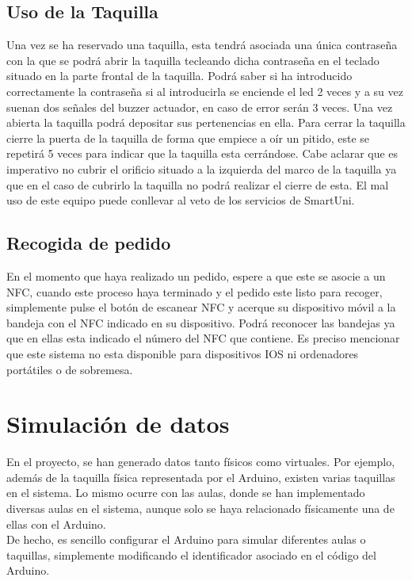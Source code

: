 \documentclass[12pt]{report}
\begin{document}
\begin{appendices}
\section{Uso de la Taquilla}
Una vez se ha reservado una taquilla, esta tendrá asociada una única contraseña con la que se podrá abrir la taquilla tecleando dicha contraseña en el teclado situado en la parte frontal de la taquilla. Podrá saber si ha introducido correctamente la contraseña si al introducirla se enciende el led 2 veces y a su vez suenan dos señales del buzzer actuador, en caso de error serán 3 veces. Una vez abierta la taquilla podrá depositar sus pertenencias en ella. Para cerrar la taquilla cierre la puerta de la taquilla de forma que empiece a oír un pitido, este se repetirá 5 veces para indicar que la taquilla esta cerrándose. Cabe aclarar que es imperativo no cubrir el orificio situado a la izquierda del marco de la taquilla ya que en el caso de cubrirlo la taquilla no podrá realizar el cierre de esta. El mal uso de este equipo puede conllevar al veto de los servicios de SmartUni.
\section{Recogida de pedido}
En el momento que haya realizado un pedido, espere a que este se asocie a un NFC, cuando este proceso haya terminado y el pedido este listo para recoger, simplemente pulse el botón de escanear NFC y acerque su dispositivo móvil a la bandeja con el NFC indicado en su dispositivo. Podrá reconocer las bandejas ya que en ellas esta indicado el número del NFC que contiene. Es preciso mencionar que este sistema no esta disponible para dispositivos IOS ni ordenadores portátiles o de sobremesa.

\newpage
\chapter{Simulación de datos}

En el proyecto, se han generado datos tanto físicos como virtuales. Por ejemplo, además de la taquilla física representada por el Arduino, existen varias taquillas en el sistema. Lo mismo ocurre con las aulas, donde se han implementado diversas aulas en el sistema, aunque solo se haya relacionado físicamente una de ellas con el Arduino.\\

De hecho, es sencillo configurar el Arduino para simular diferentes aulas o taquillas, simplemente modificando el identificador asociado en el código del Arduino.\\


\end{appendices}
\end{document}
